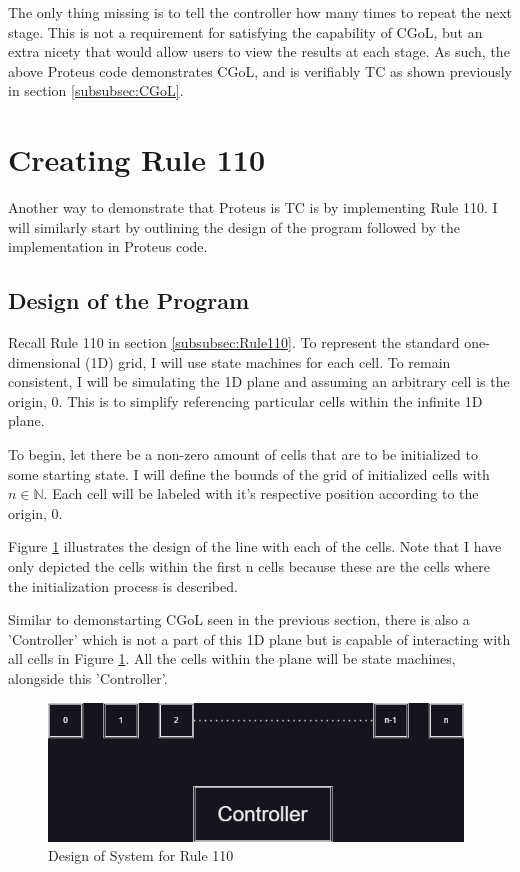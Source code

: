 The only thing missing is to tell the controller how many times to repeat the next stage.
This is not a requirement for satisfying the capability of CGoL, but an extra nicety that would allow users to view the results at each stage.
As such, the above Proteus code demonstrates CGoL, and is verifiably TC as shown previously in section \ref{subsubsec:CGoL}.

\section{Creating Rule 110}\label{sec:ImplementRule110}

Another way to demonstrate that Proteus is TC is by implementing Rule 110.
I will similarly start by outlining the design of the program followed by the implementation in Proteus code.

\subsection{Design of the Program}

Recall Rule 110 in section \ref{subsubsec:Rule110}.
To represent the standard one-dimensional (1D) grid, I will use state machines for each cell.
To remain consistent, I will be simulating the 1D plane and assuming an arbitrary cell is the origin, 0.
This is to simplify referencing particular cells within the infinite 1D plane.

To begin, let there be a non-zero amount of cells that are to be initialized to some starting state.
I will define the bounds of the grid of initialized cells with $n \in \mathbb{N}$.
Each cell will be labeled with it's respective position according to the origin, 0.

Figure \ref{fig:ProteusRule110Design} illustrates the design of the line with each of the cells.
Note that I have only depicted the cells within the first n cells because these are the cells where the initialization process is described.

Similar to demonstarting CGoL seen in the previous section, there is also a 'Controller' which is not a part of this 1D plane but is capable of interacting with all cells in Figure \ref{fig:ProteusRule110Design}.
All the cells within the plane will be state machines, alongside this 'Controller'.

\begin{figure}[htb]
    \centering
    \includegraphics[width=11cm]{Images/Rule110Design.png}
       \caption{Design of System for Rule 110}
           \label{fig:ProteusRule110Design}
\end{figure}

